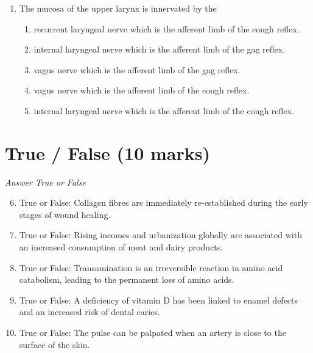 \documentclass[12pt]{article}
\begin{document}
\begin{enumerate}[label=\arabic*.]
\begin{enumerate}[label=(\alph*)]
    \item Type IIX fibres.
    \item Type III fibres.
    \item Type VII fibres.
    \item Type V fibres.
    \item Type Ia fibres.
\end{enumerate}
\item The mucosa of the upper larynx is innervated by the
\begin{enumerate}[label=(\alph*)]
    \item recurrent laryngeal nerve which is the afferent limb of the cough reflex.
    \item internal laryngeal nerve which is the afferent limb of the gag reflex.
    \item vagus nerve which is the afferent limb of the gag reflex.
    \item vagus nerve which is the afferent limb of the cough reflex.
    \item internal laryngeal nerve which is the afferent limb of the cough reflex.
\end{enumerate}
\end{enumerate}

\section*{True / False (10 marks)}
\textit{Answer True or False}
\begin{enumerate}[label=\arabic*.]
\setcounter{enumi}{5}
\item True or False: Collagen fibres are immediately re-established during the early stages of wound healing.
\item True or False: Rising incomes and urbanization globally are associated with an increased consumption of meat and dairy products.
\item True or False: Transamination is an irreversible reaction in amino acid catabolism, leading to the permanent loss of amino acids.
\item True or False: A deficiency of vitamin D has been linked to enamel defects and an increased risk of dental caries.
\item True or False: The pulse can be palpated when an artery is close to the surface of the skin.
\end{enumerate}
\end{document}
